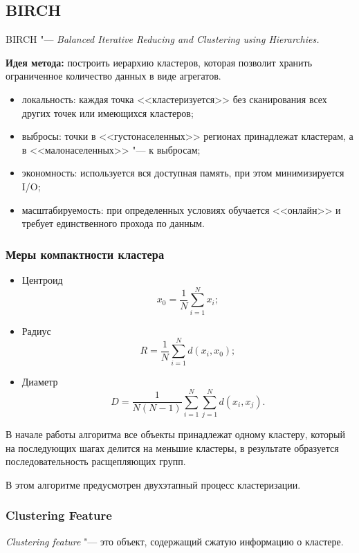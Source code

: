 
\subsection{BIRCH}

BIRCH "--- {\it  Balanced Iterative Reducing and Clustering using Hierarchies.}

{\bf Идея метода:} построить иерархию кластеров, которая позволит хранить
ограниченное количество данных в виде агрегатов.

\begin{itemize}
\item локальность: каждая точка <<кластеризуется>> без сканирования всех других точек или имеющихся кластеров;
\item выбросы: точки в <<густонаселенных>> регионах принадлежат кластерам, а в <<малонаселенных>> "--- к выбросам;
\item экономность: используется вся доступная память, при этом минимизируется I/O;
\item масштабируемость: при определенных условиях обучается <<онлайн>> и требует единственного прохода по данным.
\end{itemize}

\subsubsection{Меры компактности кластера}
\begin{itemize}
\item Центроид 
\[
x_0 = \frac{1}{N} \sum\limits_{i=1}^{N} x_i;
\]
\item Радиус
\[
R = \frac{1}{N} \sum\limits_{i=1}^{N} d(x_i,x_0);
\]
\item Диаметр
\[
D = \frac{1}{N(N-1)} \sum\limits_{i=1}^{N}\sum\limits_{j=1}^{N} d(x_i,x_j).
\]
\end{itemize}

В начале работы алгоритма все объекты принадлежат одному кластеру, который на последующих шагах делится на меньшие кластеры, в результате образуется последовательность расщепляющих групп.

В этом алгоритме предусмотрен двухэтапный процесс кластеризации.

\subsubsection{Clustering Feature}
{\it Clustering feature} "--- это объект, содержащий сжатую информацию о кластере.


